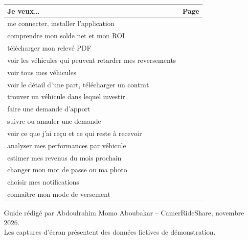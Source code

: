 \documentclass[11pt,a4paper]{article}
\begin{document}
\begin{center}
\begin{tabularx}{\linewidth}{@{}Xr@{}}
\toprule
\textbf{Je veux\ldots} & \textbf{Page}\\
\midrule
me connecter, installer l'application & \pageref{fig:connexion}\\
comprendre mon solde net et mon ROI & \pageref{fig:dashboard}\\
télécharger mon relevé PDF & \pageref{fig:releve}\\
voir les véhicules qui peuvent retarder mes reversements & \pageref{fig:surveiller}\\
voir tous mes véhicules & \pageref{fig:parc}\\
voir le détail d'une part, télécharger un contrat & \pageref{fig:detailb}\\
trouver un véhicule dans lequel investir & \pageref{fig:marche}\\
faire une demande d'apport & \pageref{fig:investir}\\
suivre ou annuler une demande & \pageref{fig:demandes}\\
voir ce que j'ai reçu et ce qui reste à recevoir & \pageref{fig:revenus}\\
analyser mes performances par véhicule & \pageref{fig:rapportsb}\\
estimer mes revenus du mois prochain & \pageref{fig:previsions}\\
changer mon mot de passe ou ma photo & \pageref{fig:profil}\\
choisir mes notifications & \pageref{fig:notifs}\\
connaître mon mode de versement & \pageref{fig:compte}\\
\bottomrule
\end{tabularx}
\end{center}

\vfill
\begin{center}\small\color{gris}
Guide rédigé par Abdoulrahim Momo Aboubakar -- CamerRideShare, novembre 2026.\\
Les captures d'écran présentent des données fictives de démonstration.
\end{center}
\end{document}
